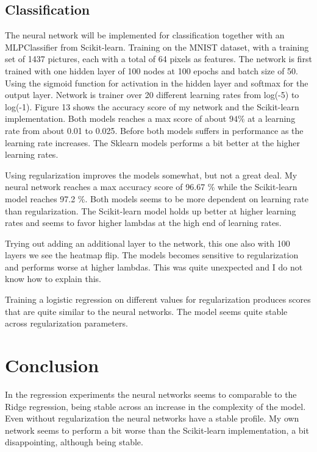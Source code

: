 \documentclass[reprint,english,notitlepage]{revtex4-2}  %
\begin{document}
\subsection{Classification}
The neural network will be implemented for classification together with an MLPClassifier from Scikit-learn. Training on the MNIST dataset, with a training set of 1437 pictures, each with a total of 64 pixels as features. The network is first trained with one hidden layer of 100 nodes at 100 epochs and batch size of 50. Using the sigmoid function for activation in the hidden layer and softmax for the output layer. Network is trainer over 20 different learning rates from log(-5) to log(-1). Figure 13 shows the accuracy score of my network and the Scikit-learn implementation. Both models reaches a max score of about $94 \%$ at a learning rate from about 0.01 to 0.025. Before both models suffers in performance as the learning rate increases. The Sklearn models performs a bit better at the higher learning rates. 

Using regularization improves the models somewhat, but not a great deal. My neural network reaches a max accuracy score of 96.67 \% while the Scikit-learn model reaches 97.2 \%. Both models seems to be more dependent on learning rate than regularization. The Scikit-learn model holds up better at higher learning rates and seems to favor higher lambdas at the high end of learning rates. 

Trying out adding an additional layer to the network, this one also with 100 layers we see the heatmap flip. The models becomes sensitive to regularization and performs worse at higher lambdas. This was quite unexpected and I do not know how to explain this.    

Training a logistic regression on different values for regularization produces scores that are quite similar to the neural networks. The model seems quite stable across regularization parameters. 

\section{Conclusion}
In the regression experiments the neural networks seems to comparable to the Ridge regression, being stable across an increase in the complexity of the model. Even without regularization the neural networks have a stable profile. My own network seems to perform a bit worse than the Scikit-learn implementation, a bit disappointing, although being stable. 
\end{document}
